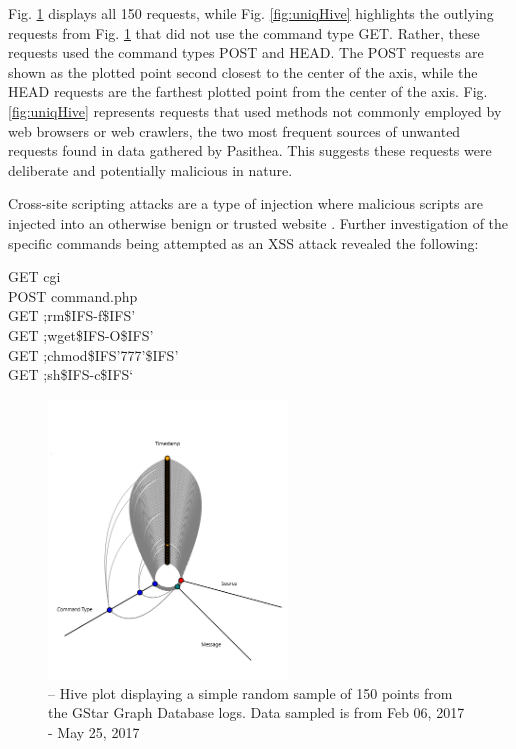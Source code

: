 Fig. \ref{fig:regHive} displays all 150 requests, while Fig. \ref{fig:uniqHive} highlights the outlying requests from Fig. \ref{fig:regHive} that did not use the command type GET.  Rather, these requests used the command types POST and HEAD. The POST requests are shown as the plotted point second closest to the center of the axis, while the HEAD requests are the farthest plotted point from the center of the axis. Fig. \ref{fig:uniqHive} represents requests that used methods not commonly employed by web browsers or web crawlers, the two most frequent sources of unwanted requests found in data gathered by Pasithea. This suggests these requests were deliberate and potentially malicious in nature.

Cross-site scripting attacks are a type of injection where malicious scripts are injected into an otherwise benign or trusted website \cite{XSS-def}. Further investigation of the specific commands being attempted as an XSS attack revealed the following:

\noindent GET cgi\\
POST command.php\\
GET ;rm\$IFS-f\$IFS’\\
GET ;wget\$IFS-O\$IFS’\\
GET ;chmod\$IFS’777’\$IFS’\\
GET ;sh\$IFS-c\$IFS‘

\begin{figure}[h]
\centering
\includegraphics[width=2.5in]{images/regHive.png} 
\caption{-- Hive plot displaying a simple random sample of 150 points from the GStar Graph Database logs. Data sampled is from Feb 06, 2017 - May 25, 2017}
\label{fig:regHive}
\end{figure}

